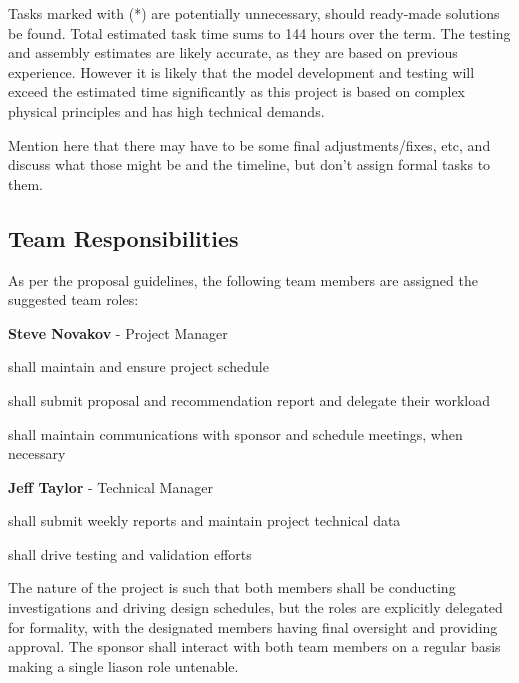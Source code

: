 Tasks marked with (*) are potentially unnecessary, should ready-made solutions
be found. Total estimated task time sums to 144 hours over the term. The testing
and assembly estimates are likely accurate, as they are based on previous
experience. However it is likely that the model development and testing will
exceed the estimated time significantly as this project is based on complex
physical principles and has high technical demands.

Mention here that there may have to be some final adjustments/fixes, etc, and
discuss what those might be and the timeline, but don't assign formal tasks to
them.

\subsection{Team Responsibilities} %

As per the proposal guidelines, the following team members are assigned the
suggested team roles:
\begin{packed_itemize}
  \item{\textbf{Steve Novakov} - Project Manager}
    \begin{packed_itemize}
      \item shall maintain and ensure project schedule
      \item shall submit proposal and recommendation report and delegate their
      workload
      \item shall maintain communications with sponsor and schedule meetings,
      when necessary
    \end{packed_itemize}
  \item{\textbf{Jeff Taylor} - Technical Manager}
    \begin{packed_itemize}
      \item shall submit weekly reports and maintain project technical data
      \item shall drive testing and validation efforts
    \end{packed_itemize}
\end{packed_itemize}

The nature of the project is such that both members shall be conducting
investigations and driving design schedules, but the roles are explicitly
delegated for formality, with the designated members having final oversight
and providing approval. The sponsor shall interact with both team members on a
regular basis making a single liason role untenable.

